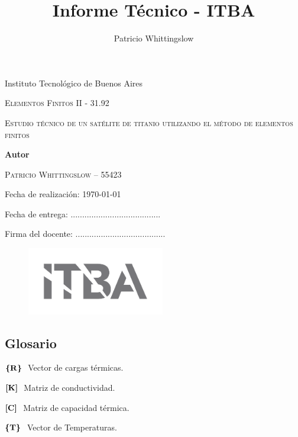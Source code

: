 \documentclass[onecolumn,10pt,titlepage,a4paper]{article}
\title{Informe Técnico - ITBA}
\author{Patricio Whittingslow}
\newcommand{\glossentry}[2]{$#1\ $ \indent #2 \par \vspace{.4cm} }
\begin{document}
\begin{titlepage}
	\centering
	
	{ \large Instituto Tecnológico de Buenos Aires  \par }
	\vspace{2cm}
	{\Large \scshape Elementos Finitos II - 31.92 \par}
	\vspace{2cm}
	{\Huge \scshape Estudio técnico de un satélite de titanio utilizando el método de elementos finitos\par }
	\vspace{.5cm}
	{\Large  \par}
	\vspace{2cm}
	{\large \bf Autor \par}
	\vspace{.5cm}
	\textsc{\large Patricio Whittingslow -- 55423}
	\vspace{2cm}
	{\par \large Fecha de realización: \today \par}
	\vspace{1cm}
	{\large Fecha de entrega: .......................................\par}
	\vspace{\fill}
	{\large Firma del docente: .......................................}
	\vspace{\fill}
	\begin{figure}[htb!]
		\centering
		\includegraphics[width=6cm]{fig/logoitba.png}
	\end{figure}
\end{titlepage}




\begin{multicols}{2}
	\section*{Glosario}
	\glossentry{\Cme{R}}{Vector de cargas térmicas.}
	\glossentry{\Mme{K}}{Matriz de conductividad.}
	\glossentry{\Mme{C}}{Matriz de capacidad térmica.}
	\glossentry{\Cme{T}}{Vector de Temperaturas.}
\end{multicols}
\end{document}
